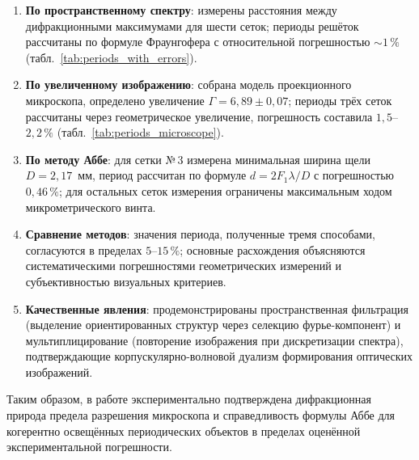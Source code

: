 \documentclass[a4paper]{article}
\begin{document}
\begin{enumerate}
    \item \textbf{По пространственному спектру}: измерены расстояния между дифракционными максимумами для шести сеток; периоды решёток рассчитаны по формуле Фраунгофера с относительной погрешностью $\sim 1\,\%$ (табл.~\ref{tab:periods_with_errors}).
    
    \item \textbf{По увеличенному изображению}: собрана модель проекционного микроскопа, определено увеличение $\Gamma = 6{,}89 \pm 0{,}07$; периоды трёх сеток рассчитаны через геометрическое увеличение, погрешность составила $1{,}5$--$2{,}2\,\%$ (табл.~\ref{tab:periods_microscope}).
    
    \item \textbf{По методу Аббе}: для сетки №\,3 измерена минимальная ширина щели $D = 2{,}17$~мм, период рассчитан по формуле $d = 2F_1\lambda/D$ с погрешностью $0{,}46\,\%$; для остальных сеток измерения ограничены максимальным ходом микрометрического винта.
    
    \item \textbf{Сравнение методов}: значения периода, полученные тремя способами, согласуются в пределах $5$--$15\,\%$; основные расхождения объясняются систематическими погрешностями геометрических измерений и субъективностью визуальных критериев.
    
    \item \textbf{Качественные явления}: продемонстрированы пространственная фильтрация (выделение ориентированных структур через селекцию фурье-компонент) и мультиплицирование (повторение изображения при дискретизации спектра), подтверждающие корпускулярно-волновой дуализм формирования оптических изображений.
\end{enumerate}

Таким образом, в работе экспериментально подтверждена дифракционная природа предела разрешения микроскопа и справедливость формулы Аббе для когерентно освещённых периодических объектов в пределах оценённой экспериментальной погрешности.
\end{document}
